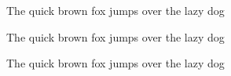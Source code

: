 \documentclass{article}
\begin{document}
\Huge
The quick brown fox jumps over the lazy dog

The quick brown fox jumps over the lazy dog

The quick brown fox jumps over the lazy dog
\end{document}
